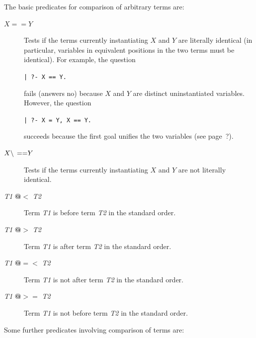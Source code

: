 The basic predicates for comparison of arbitrary terms are:
\begin{description}
\item[$X == Y$] 
    Tests if the terms currently instantiating $X$ and $Y$
    are literally identical
    (in particular, variables in equivalent positions in the
    two terms must be identical).
    For example, the question
    \begin{center}
    {\tt | ?- X == Y.}
    \end{center}
    fails (answers no) because $X$ and $Y$ are distinct uninstantiated
    variables.
    However, the question
    \begin{center}
    {\tt | ?- X = Y, X == Y.}
    \end{center}
    succeeds because the first goal unifies the two variables (see page~?).

\item[$X {\bf \backslash\,==} Y$]
    Tests if the terms currently instantiating $X$ and $Y$
    are not literally identical.

\item[{\em T1} {\bf @$<$} {\em T2}]
    Term {\em T1} is before term {\em T2} in the standard order.

\item[{\em T1} {\bf @$>$} {\em T2}]
    Term {\em T1} is after term {\em T2} in the standard order.

\item[{\em T1} {\bf @$=<$} {\em T2}]
    Term {\em T1} is not after term {\em T2} in the standard order.

\item[{\em T1} {\bf @$>=$} {\em T2}]
    Term {\em T1} is not before term {\em T2} in the standard order.
\end{description}

Some further predicates involving comparison of terms are:


